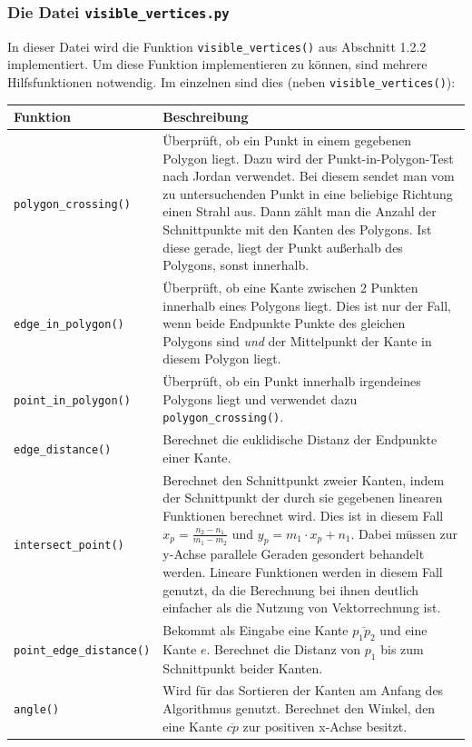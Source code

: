 \documentclass[a4paper, notitlepage, 12pt]{scrartcl}
\begin{document}
\subsubsection{Die Datei \texttt{visible\_vertices.py}}
In dieser Datei wird die Funktion \texttt{visible\_vertices()} aus Abschnitt 1.2.2 implementiert. Um diese Funktion implementieren zu können, sind mehrere Hilfsfunktionen notwendig. Im einzelnen sind dies (neben \texttt{visible\_vertices()}):
\begin{longtabu} to \linewidth {lX}
	Funktion & Beschreibung \\ \hline \hline \endhead
	\texttt{polygon\_crossing()} & Überprüft, ob ein Punkt in einem gegebenen Polygon liegt. Dazu wird der Punkt-in-Polygon-Test nach Jordan verwendet. Bei diesem sendet man vom zu untersuchenden Punkt in eine beliebige Richtung einen Strahl aus. Dann zählt man die Anzahl der Schnittpunkte mit den Kanten des Polygons. Ist diese gerade, liegt der Punkt außerhalb des Polygons, sonst innerhalb. \\ \hline
	\texttt{edge\_in\_polygon()} & Überprüft, ob eine Kante zwischen 2 Punkten innerhalb eines Polygons liegt. Dies ist nur der Fall, wenn beide Endpunkte Punkte des gleichen Polygons sind \textit{und} der Mittelpunkt der Kante in diesem Polygon liegt. \\ \hline
	\texttt{point\_in\_polygon()} & Überprüft, ob ein Punkt innerhalb irgendeines Polygons liegt und verwendet dazu \texttt{polygon\_crossing()}.\\ \hline
	\texttt{edge\_distance()} &  Berechnet die euklidische Distanz der Endpunkte einer Kante.\\ \hline
	\texttt{intersect\_point()} & Berechnet den Schnittpunkt zweier Kanten, indem der Schnittpunkt der durch sie gegebenen linearen Funktionen berechnet wird. Dies ist in diesem Fall $x_p = \frac{n_2 - n_1}{m_1 - m_2}$ und $y_p = m_1 \cdot x_p + n_1$. Dabei müssen zur y-Achse parallele Geraden gesondert behandelt werden. Lineare Funktionen werden in diesem Fall genutzt, da die Berechnung bei ihnen deutlich einfacher als die Nutzung von Vektorrechnung ist.\\ \hline
	\texttt{point\_edge\_distance()} & Bekommt als Eingabe eine Kante $\overline{p_1p_2}$ und eine Kante $e$. Berechnet die Distanz von $p_1$ bis zum Schnittpunkt beider Kanten.\\ \hline
	\texttt{angle()} & Wird für das Sortieren der Kanten am Anfang des Algorithmus genutzt. Berechnet den Winkel, den eine Kante $\overline{cp}$ zur positiven x-Achse besitzt.\\ \hline

\end{longtabu}
\end{document}
